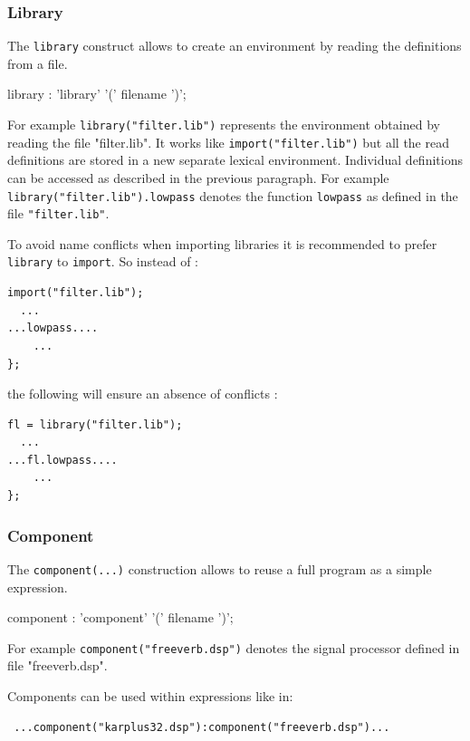 \documentclass[a4paper,10pt]{book}
\begin{document}
\subsubsection{Library} 
The \lstinline'library' construct allows to create an environment by reading the definitions from a file.

\begin{rail}
library :    'library' '(' filename ')';
\end{rail}

For example \lstinline'library("filter.lib")' represents the environment 
obtained by reading the file "filter.lib". It works like \lstinline'import("filter.lib")' but all the read definitions are stored in a new separate lexical environment. Individual definitions can be accessed as described in the previous paragraph. For example \lstinline'library("filter.lib").lowpass' denotes the function \lstinline'lowpass' as defined in the file \lstinline'"filter.lib"'.

To avoid name conflicts when importing libraries it is recommended to prefer \lstinline'library' to \lstinline'import'. So instead of :

\begin{lstlisting}
import("filter.lib");
  ...
...lowpass....
	...
};
\end{lstlisting}
the following will ensure an absence of conflicts : 
\begin{lstlisting}
fl = library("filter.lib");
  ...
...fl.lowpass....
	...
};
\end{lstlisting}




\subsubsection{Component} 
The \lstinline'component(...)' construction allows to reuse a full \faust program as a simple expression.

\begin{rail}
component :    'component' '(' filename ')';
\end{rail}

 For example \lstinline'component("freeverb.dsp")' denotes the signal processor defined in file "freeverb.dsp". 
 
 Components can be used within expressions like in: 
 \begin{lstlisting}
 ...component("karplus32.dsp"):component("freeverb.dsp")... 
 \end{lstlisting}
 
\end{document}
